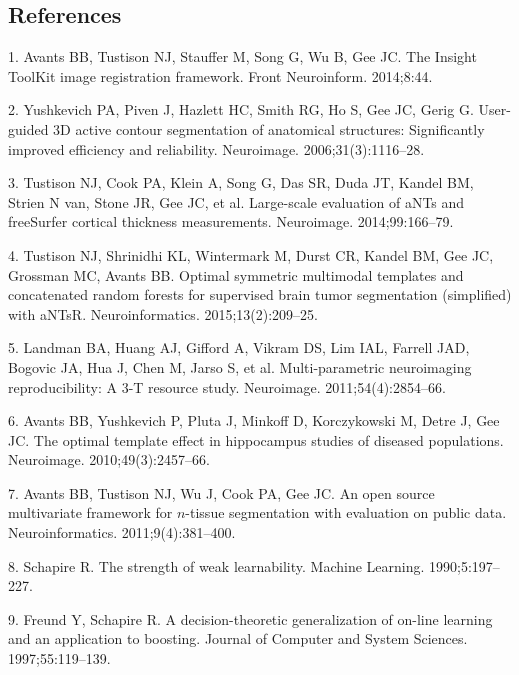 \documentclass[12pt,]{article}
\begin{document}
\clearpage

\subsection*{References}\label{references}

\hypertarget{refs}{}
\hypertarget{ref-Avants:2014aa}{}
1. Avants BB, Tustison NJ, Stauffer M, Song G, Wu B, Gee JC. The Insight
ToolKit image registration framework. Front Neuroinform. 2014;8:44.

\hypertarget{ref-Yushkevich:2006aa}{}
2. Yushkevich PA, Piven J, Hazlett HC, Smith RG, Ho S, Gee JC, Gerig G.
User-guided 3D active contour segmentation of anatomical structures:
Significantly improved efficiency and reliability. Neuroimage.
2006;31(3):1116--28.

\hypertarget{ref-Tustison:2014ab}{}
3. Tustison NJ, Cook PA, Klein A, Song G, Das SR, Duda JT, Kandel BM,
Strien N van, Stone JR, Gee JC, et al. Large-scale evaluation of aNTs
and freeSurfer cortical thickness measurements. Neuroimage.
2014;99:166--79.

\hypertarget{ref-Tustison:2015aa}{}
4. Tustison NJ, Shrinidhi KL, Wintermark M, Durst CR, Kandel BM, Gee JC,
Grossman MC, Avants BB. Optimal symmetric multimodal templates and
concatenated random forests for supervised brain tumor segmentation
(simplified) with aNTsR. Neuroinformatics. 2015;13(2):209--25.

\hypertarget{ref-landman2011}{}
5. Landman BA, Huang AJ, Gifford A, Vikram DS, Lim IAL, Farrell JAD,
Bogovic JA, Hua J, Chen M, Jarso S, et al. Multi-parametric neuroimaging
reproducibility: A 3-T resource study. Neuroimage. 2011;54(4):2854--66.

\hypertarget{ref-Avants:2010aa}{}
6. Avants BB, Yushkevich P, Pluta J, Minkoff D, Korczykowski M, Detre J,
Gee JC. The optimal template effect in hippocampus studies of diseased
populations. Neuroimage. 2010;49(3):2457--66.

\hypertarget{ref-Avants:2011aa}{}
7. Avants BB, Tustison NJ, Wu J, Cook PA, Gee JC. An open source
multivariate framework for \(n\)-tissue segmentation with evaluation on
public data. Neuroinformatics. 2011;9(4):381--400.

\hypertarget{ref-schapire1990}{}
8. Schapire R. The strength of weak learnability. Machine Learning.
1990;5:197--227.

\hypertarget{ref-freund1997}{}
9. Freund Y, Schapire R. A decision-theoretic generalization of on-line
learning and an application to boosting. Journal of Computer and System
Sciences. 1997;55:119--139.
\end{document}

